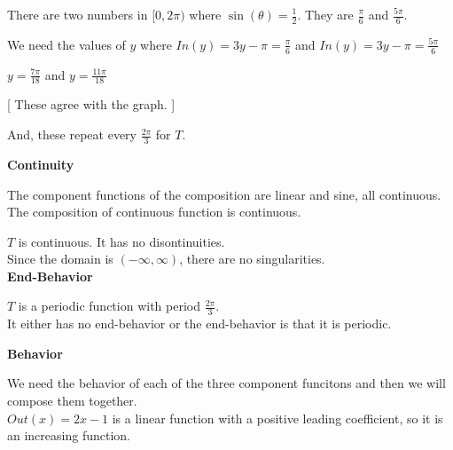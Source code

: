 \documentclass{ximera}
\begin{document}
There are two numbers in $[0, 2\pi)$ where $\sin(\theta) = \frac{1}{2}$.  They are $\frac{\pi}{6}$ and $\frac {5\pi}{6}$.

We need the values of $y$ where $In(y) = 3y - \pi = \frac{\pi}{6}$ and $In(y) = 3y - \pi = \frac{5\pi}{6}$

$y = \frac{7\pi}{18}$  and   $y = \frac{11\pi}{18}$

[ These agree with the graph. ]


And, these repeat every $\frac{2\pi}{3}$ for $T$.












\textbf{\textcolor{blue!55!black}{Continuity}}


The component functions of the composition are linear and sine, all continuous. \\

The composition of continuous function is continuous.

$T$ is continuous. It has no disontinuities. \\


Since the domain is $(-\infty, \infty)$, there are no singularities. \\








\textbf{\textcolor{blue!55!black}{End-Behavior}}


$T$ is a periodic function with period $\frac{2\pi}{3}$. \\

It either has no end-behavior or the end-behavior is that it is periodic.












\textbf{\textcolor{blue!55!black}{Behavior}}


We need the behavior of each of the three component funcitons and then we will compose them together. \\




$Out(x) = 2x - 1$ is a linear function with a positive leading coefficient, so it is an increasing function.\\
\end{document}
